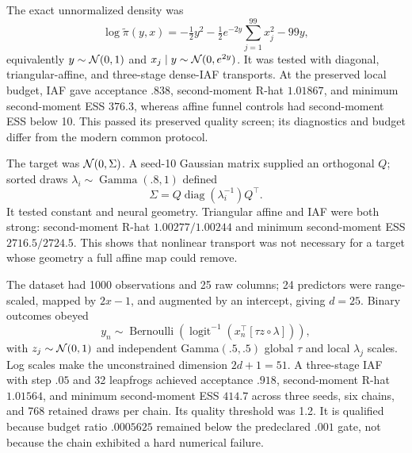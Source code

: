 \begin{description}[style=nextline]
 \item[Neal funnel, dimension 100.] The exact unnormalized density was
 \begin{equation}
  \log\widetilde\pi(y,x)=-\tfrac12y^2-\tfrac12e^{-2y}
  \sum_{j=1}^{99}x_j^2-99y,
 \end{equation}
 equivalently $y\sim\mathcal{N}(0,1)$ and $x_j\mid y\sim\mathcal{N}(0,e^{2y})$.
 It was tested with
 diagonal, triangular-affine, and three-stage dense-IAF transports.  At the
 preserved local budget, IAF gave acceptance $.838$, second-moment R-hat
 $1.01867$, and minimum second-moment ESS $376.3$, whereas affine funnel
 controls had second-moment ESS below 10.  This passed its preserved quality
 screen; its
 diagnostics and budget differ from the modern common protocol.

 \item[Ill-conditioned Gaussian, dimension 100.] The target was
 $\mathcal{N}(0,\Sigma)$.  A seed-10 Gaussian matrix supplied an orthogonal $Q$;
 sorted draws $\lambda_i\sim\operatorname{Gamma}(.8,1)$ defined
\begin{equation}
 \Sigma=Q\operatorname{diag}(\lambda_i^{-1})Q^\top.
\end{equation}
It tested constant and
 neural geometry.  Triangular affine and IAF were
 both strong: second-moment R-hat $1.00277/1.00244$ and minimum second-moment ESS
 $2716.5/2724.5$.  This shows that nonlinear transport was not necessary for a
 target whose geometry a full affine map could remove.

 \item[German-credit sparse logistic regression, dimension 51.] The dataset
 had 1000 observations and 25 raw columns; 24 predictors were range-scaled,
 mapped by $2x-1$, and augmented by an intercept, giving $d=25$.  Binary
 outcomes obeyed
\begin{equation}
 y_n\sim\operatorname{Bernoulli}\!\left(
 \operatorname{logit}^{-1}(x_n^\top[\tau z\circ\lambda])\right),
\end{equation}
with
 $z_j\sim\mathcal{N}(0,1)$ and independent Gamma$(.5,.5)$ global $\tau$ and local
 $\lambda_j$ scales.  Log scales make the unconstrained dimension
 $2d+1=51$.  A three-stage IAF with
 step $.05$ and 32 leapfrogs achieved acceptance $.918$, second-moment R-hat
 $1.01564$, and minimum second-moment ESS $414.7$ across three seeds, six chains,
 and 768 retained draws per chain.  Its quality threshold was 1.2.  It is
 qualified because budget ratio $.0005625$ remained below the predeclared
 $.001$ gate, not because the chain exhibited a hard numerical failure.


\end{description}

